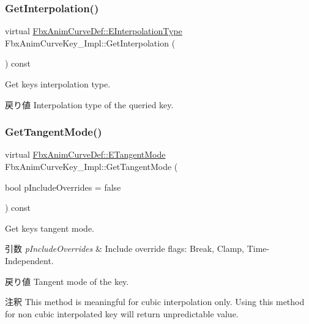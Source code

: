 \subsubsection{\texorpdfstring{Get\+Interpolation()}{GetInterpolation()}}
{\footnotesize\ttfamily virtual \hyperlink{class_fbx_anim_curve_def_add2ab7d10d856ab0868cc9b143d59ea5}{Fbx\+Anim\+Curve\+Def\+::\+E\+Interpolation\+Type} Fbx\+Anim\+Curve\+Key\+\_\+\+Impl\+::\+Get\+Interpolation (\begin{DoxyParamCaption}{ }\end{DoxyParamCaption}) const\hspace{0.3cm}{\ttfamily [pure virtual]}}

Get key\textquotesingle{}s interpolation type. \begin{DoxyReturn}{戻り値}
Interpolation type of the queried key. 
\end{DoxyReturn}
\mbox{\label{class_fbx_anim_curve_key___impl_a220af9fcf94a2fb3e795d1d6f99422f8}} 
\subsubsection{\texorpdfstring{Get\+Tangent\+Mode()}{GetTangentMode()}}
{\footnotesize\ttfamily virtual \hyperlink{class_fbx_anim_curve_def_ac810ccc5ca0527704ab5175479964b87}{Fbx\+Anim\+Curve\+Def\+::\+E\+Tangent\+Mode} Fbx\+Anim\+Curve\+Key\+\_\+\+Impl\+::\+Get\+Tangent\+Mode (\begin{DoxyParamCaption}\item[{bool}]{p\+Include\+Overrides = {\ttfamily false} }\end{DoxyParamCaption}) const\hspace{0.3cm}{\ttfamily [pure virtual]}}

Get key\textquotesingle{}s tangent mode. 
\begin{DoxyParams}{引数}
{\em p\+Include\+Overrides} & Include override flags\+: Break, Clamp, Time-\/\+Independent. \\
\hline
\end{DoxyParams}
\begin{DoxyReturn}{戻り値}
Tangent mode of the key. 
\end{DoxyReturn}
\begin{DoxyRemark}{注釈}
This method is meaningful for cubic interpolation only. Using this method for non cubic interpolated key will return unpredictable value. 
\end{DoxyRemark}
\mbox{\label{class_fbx_anim_curve_key___impl_ad3a162e0e05faac105c042419645768d}} 
